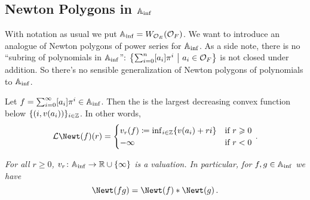 \subsection{Newton Polygons in \texorpdfstring{$\mathbb{A}_{\mathrm{inf}}$}{Ainf}}
With notation as usual we put $\mathbb{A}_{\mathrm{inf}}=W_{\mathcal{O}_E}(\mathcal{O}_F)$. We want to introduce an analogue of Newton polygons of power series for $\mathbb{A}_{\mathrm{inf}}$. As a side note, there is no \enquote{subring of polynomials in $\mathbb{A}_{\mathrm{inf}}$}: $\left\{\sum_{i=0}^n[a_i]\pi^i\ \middle|\  a_i\in\mathcal{O}_F\right\}$ is not closed under addition. So there's no sensible generalization of Newton polygons of polynomials to $\mathbb{A}_{\mathrm{inf}}$.
\begin{defi}\label{def:AinfNewton}
	Let $f=\sum_{i=0}^\infty[a_i]\pi^i\in\mathbb{A}_{\mathrm{inf}}$. Then the  is the largest decreasing convex function below $\{(i,v(a_i))\}_{i\in\mathbb{Z}}$. In other words,
	\begin{equation*}
		\Ll\Newt(f)(r)=\begin{cases}
		v_r(f)\coloneqq\inff_{i\in\IZ}\{v(a_i)+ri\} & \text{if }r\geq 0\\
		-\infty & \text{if }r<0
		\end{cases}\,.
	\end{equation*}
\end{defi}
\label{lem:vrValuation}\itshape
For all $r\geq 0$, $v_r\colon \IA_\inf\morphism\IR\cup\{\infty\}$ is a valuation. In particular, for $f,g\in\mathbb{A}_{\mathrm{inf}}$ we have
\begin{equation*}
	\Newt(fg)=\Newt(f)*\Newt(g)\,.
\end{equation*}\upshape
